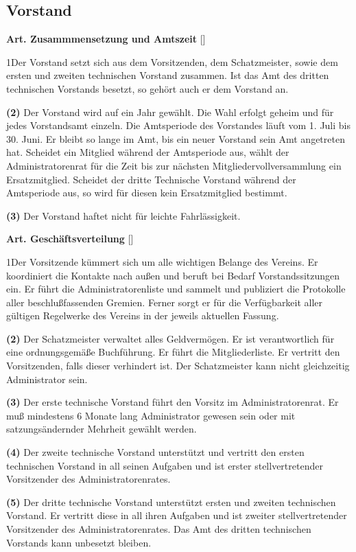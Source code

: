 \documentclass[12pt]{article}
\newcommand{\UAbschnitt}[1]{\subsection{#1}}
\newcommand{\Satz}[2]{

\begin{samepage}
{\bf (#1)} #2
\end{samepage}
}
\newenvironment{Artikel}[2]{
\bigskip \centerline{{\bf Art. #1} [#2]}
\nopagebreak
}{
}
\begin{document}
\UAbschnitt{Vorstand}

\begin{Artikel}{22}{Zusammmensetzung und Amtszeit}

\Satz{1}{Der Vorstand setzt sich aus dem Vorsitzenden, dem Schatzmeister, sowie dem ersten und zweiten technischen Vorstand zusammen.
  Ist das Amt des dritten technischen Vorstands besetzt, so gehört auch er dem Vorstand an.}

\Satz{2}{Der Vorstand wird auf ein Jahr gewählt.
  Die Wahl erfolgt geheim und für jedes Vorstandsamt einzeln.
  Die Amtsperiode des Vorstandes läuft vom 1. Juli bis 30. Juni.
  Er bleibt so lange im Amt, bis ein neuer Vorstand sein Amt angetreten hat.
  Scheidet ein Mitglied während der Amtsperiode aus, wählt der Administratorenrat für die Zeit bis zur nächsten Mitgliedervollversammlung ein Ersatzmitglied.
  Scheidet der dritte Technische Vorstand während der Amtsperiode aus, so wird für diesen kein Ersatzmitglied bestimmt.}

\Satz{3}{Der Vorstand haftet nicht für leichte Fahrlässigkeit.}

\end{Artikel}

\begin{Artikel}{23}{Geschäftsverteilung}

\Satz{1}{Der Vorsitzende kümmert sich um alle wichtigen Belange des Vereins.
  Er koordiniert die Kontakte nach außen und beruft bei Bedarf Vorstandssitzungen ein.
  Er führt die Administratorenliste und sammelt und publiziert die Protokolle aller beschlußfassenden Gremien.
  Ferner sorgt er für die Verfügbarkeit aller gültigen Regelwerke des Vereins in der jeweils aktuellen Fassung.}

\Satz{2}{Der Schatzmeister verwaltet alles Geldvermögen.
  Er ist verantwortlich für eine ordnungsgemäße Buchführung.
  Er führt die Mitgliederliste.
  Er vertritt den Vorsitzenden, falls dieser verhindert ist.
  Der Schatzmeister kann nicht gleichzeitig Administrator sein.}

\Satz{3}{Der erste technische Vorstand führt den Vorsitz im Administratorenrat.
  Er muß mindestens 6 Monate lang Administrator gewesen sein oder mit satzungsändernder Mehrheit gewählt werden.}

\Satz{4}{Der zweite technische Vorstand unterstützt und vertritt den ersten technischen Vorstand in all seinen Aufgaben und ist erster stellvertretender Vorsitzender des Administratorenrates.}

\Satz{5}{Der dritte technische Vorstand unterstützt ersten und zweiten technischen Vorstand.
  Er vertritt diese in all ihren Aufgaben und ist zweiter stellvertretender Vorsitzender des Administratorenrates.
  Das Amt des dritten technischen Vorstands kann unbesetzt bleiben.}

\end{Artikel}
\end{document}
